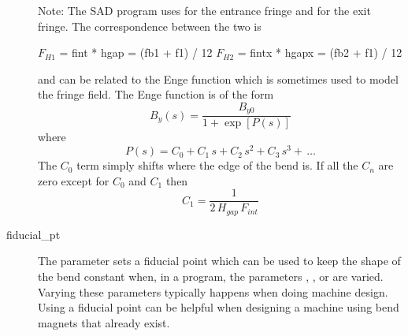 \begin{description}
Note: The SAD program uses  for the entrance fringe and  for the exit
fringe. The correspondence between the two is
\begin{example2}
  \(F_{H1}\) = fint  * hgap  = (fb1 + f1) / 12
  \(F_{H2}\) = fintx * hgapx = (fb2 + f1) / 12
\end{example2}

 and  can be related to the Enge function which is sometimes used to model the
fringe field. The Enge function is of the form
\begin{equation}
  B_y(s) = \frac{B_{y0}}{1 + \exp[P(s)]}
\end{equation}
where
\begin{equation}
  P(s) = C_0 + C_1 \, s + C_2 \, s^2 + C_3 \, s^3 + \, \ldots
\end{equation}
The $C_0$ term simply shifts where the edge of the bend is. If all the $C_n$ are zero except for
$C_0$ and $C_1$ then
\begin{equation}
  C_1 = \frac{1}{2 \,H_{gap} \, F_{int}}
\end{equation}
  \item[fiducial_pt] \Newline
The  parameter sets a fiducial point which can be used to keep the shape of the bend
constant when, in a program, the parameters , ,  or  are varied.
Varying these parameters typically happens when doing machine design. Using a fiducial point can be
helpful when designing a machine using bend magnets that already exist.


\end{description}

